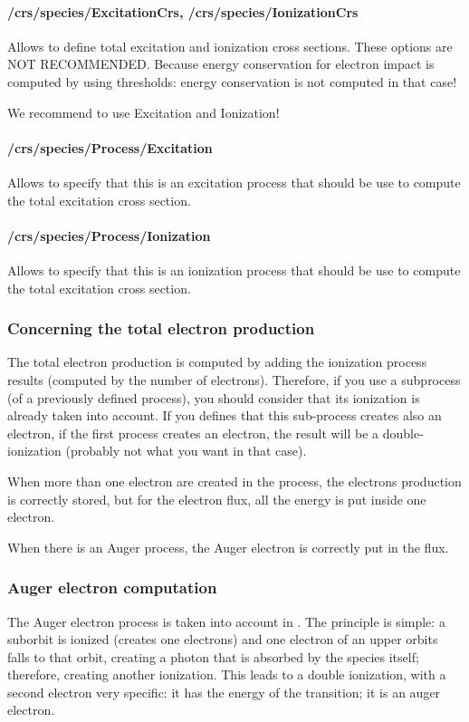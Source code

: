 \paragraph{/crs/species/ExcitationCrs, /crs/species/IonizationCrs}
Allows to define total excitation and ionization cross sections.
These options are NOT RECOMMENDED. Because energy conservation for electron impact is computed by using thresholds: energy conservation is not computed in that case!

We recommend to use Excitation and Ionization!

\paragraph{/crs/species/Process/Excitation}
Allows to specify that this is an excitation process that should be use to compute the total excitation cross section. 

\paragraph{/crs/species/Process/Ionization}
Allows to specify that this is an ionization process that should be use to compute the total excitation cross section. 
\subsubsection{Concerning the total electron production}
The total electron production is computed by adding the ionization process results (computed by the number of electrons).
Therefore, if you use a subprocess (of a previously defined process), you should consider that its ionization is already taken into account.
If you defines that this sub-process creates also an electron, if the first process creates an electron, the result will be a double-ionization (probably not what you want in that case).

When more than one electron are created in the process, the electrons production is correctly stored, but for the electron flux, all the energy is put inside one electron.

When there is an Auger process, the Auger electron is correctly put in the flux.

\subsubsection{Auger electron computation}

The Auger electron process is taken into account in \Prog. The principle is simple: a suborbit is ionized (creates one electrons) and one electron of an upper orbits falls to that orbit, creating a photon that is absorbed by the species itself; therefore, creating another ionization.
This leads to a double ionization, with a second electron very specific: it has the energy of the transition; it is an auger electron.

